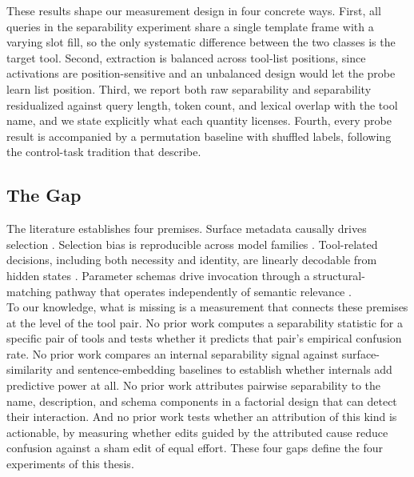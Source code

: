 These results shape our measurement design in four concrete ways.
First, all queries in the separability experiment share a single template frame with a varying slot fill, so the only systematic difference between the two classes is the target tool.
Second, extraction is balanced across tool-list positions, since activations are position-sensitive and an unbalanced design would let the probe learn list position.
Third, we report both raw separability and separability residualized against query length, token count, and lexical overlap with the tool name, and we state explicitly what each quantity licenses.
Fourth, every probe result is accompanied by a permutation baseline with shuffled labels, following the control-task tradition that \textcite{hewitt2019control} describe.

\subsection{The Gap}

The literature establishes four premises.
Surface metadata causally drives selection \cite{sneh2025tooltweak}.
Selection bias is reproducible across model families \cite{blankenstein2025biasbusters}.
Tool-related decisions, including both necessity and identity, are linearly decodable from hidden states \cite{sun2026when2tool,wu2026linearly}.
Parameter schemas drive invocation through a structural-matching pathway that operates independently of semantic relevance \cite{liu2026structural}.
\\

To our knowledge, what is missing is a measurement that connects these premises at the level of the tool pair.
No prior work computes a separability statistic for a specific pair of tools and tests whether it predicts that pair's empirical confusion rate.
No prior work compares an internal separability signal against surface-similarity and sentence-embedding baselines to establish whether internals add predictive power at all.
No prior work attributes pairwise separability to the name, description, and schema components in a factorial design that can detect their interaction.
And no prior work tests whether an attribution of this kind is actionable, by measuring whether edits guided by the attributed cause reduce confusion against a sham edit of equal effort.
These four gaps define the four experiments of this thesis.
